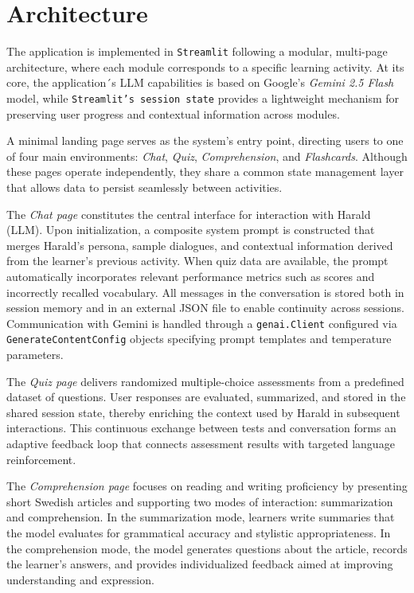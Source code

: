\documentclass[a4paper,10pt]{article}
\begin{document}
\section{Architecture}
The application is implemented in \texttt{Streamlit} following a modular, multi-page architecture, where each module corresponds to a specific learning activity. At its core, the application´s LLM capabilities is based on Google’s \textit{Gemini 2.5 Flash} model, while \texttt{Streamlit’s session state} provides a lightweight mechanism for preserving user progress and contextual information across modules. 

A minimal landing page serves as the system’s entry point, directing users to one of four main environments: \textit{Chat}, \textit{Quiz}, \textit{Comprehension}, and \textit{Flashcards}. Although these pages operate independently, they share a common state management layer that allows data to persist seamlessly between activities.

The \textit{Chat page} constitutes the central interface for interaction with Harald (LLM). Upon initialization, a composite system prompt is constructed that merges Harald’s persona, sample dialogues, and contextual information derived from the learner’s previous activity. When quiz data are available, the prompt automatically incorporates relevant performance metrics such as scores and incorrectly recalled vocabulary. All messages in the conversation is stored both in session memory and in an external JSON file to enable continuity across sessions. Communication with Gemini is handled through a \texttt{genai.Client} configured via \texttt{GenerateContentConfig} objects specifying prompt templates and temperature parameters.

The \textit{Quiz page} delivers randomized multiple-choice assessments from a predefined dataset of questions. User responses are evaluated, summarized, and stored in the shared session state, thereby enriching the context used by Harald in subsequent interactions. This continuous exchange between tests and conversation forms an adaptive feedback loop that connects assessment results with targeted language reinforcement.

The \textit{Comprehension page} focuses on reading and writing proficiency by presenting short Swedish articles and supporting two modes of interaction: summarization and comprehension. In the summarization mode, learners write summaries that the model evaluates for grammatical accuracy and stylistic appropriateness. In the comprehension mode, the model generates questions about the article, records the learner’s answers, and provides individualized feedback aimed at improving understanding and expression.
\end{document}
